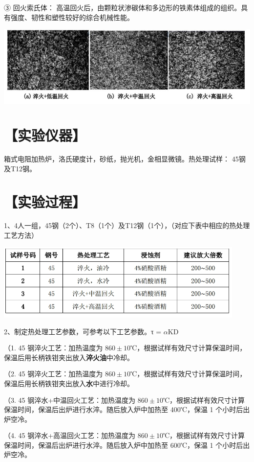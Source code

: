\documentclass[a4paper,utf8]{article}
\begin{document}
③ 回火索氏体：
高温回火后，由颗粒状渗碳体和多边形的铁素体组成的组织。具有强度、韧性和塑性较好的综合机械性能。

\begin{center}
    \includegraphics[width=400pt]{2.png}
\end{center}

\section*{【实验仪器】}%
箱式电阻加热炉，洛氏硬度计，砂纸，抛光机，金相显微镜。热处理试样：
45钢及T12钢。
\section*{【实验过程】}%
1、4人一组，45钢（2个）、T8（1个）及T12钢（1个），（对应下表中相应的热处理工艺方法）

\begin{center}
    \includegraphics[width=350pt]{3.png}
\end{center}

2、制定热处理工艺参数，可参考以下工艺参数。τ = $\alpha$KD


（1. 45 钢淬火工艺：加热温度为 $860 \pm 10$℃，根据试样有效尺寸计算保温时间，保温后用长柄铁钳夹出放入\textbf{淬火油}中冷却。

（2. 45 钢淬火工艺：加热温度为 $860 \pm 10$℃，根据试样有效尺寸计算保温时间，保温后用长柄铁钳夹出放入\textbf{水}中进行冷却。

（3. 45 钢淬水+中温回火工艺：加热温度为 $860 \pm 10$℃，根据试样有效尺寸计算保温时间，保温后出炉进行水淬。随后放入炉中加热至 400℃，保温 1 个小时后出炉空冷。

（4. 45 钢淬水+高温回火工艺：加热温度为 $860 \pm 10$℃，根据试样有效尺寸计算保温时间，保温后出炉进行水淬。随后放入炉中加热至 600℃，保温 1 个小时后出炉空冷。
\end{document}
